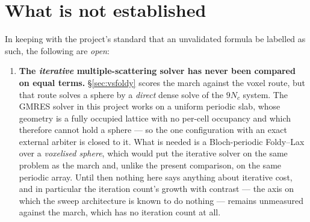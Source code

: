 \documentclass[11pt,a4paper]{article}
\begin{document}
\section{What is not established}\label{sec:open}

In keeping with the project's standard that an unvalidated formula be labelled
as such, the following are \emph{open}:

\begin{enumerate}
\item \textbf{The \emph{iterative} multiple-scattering solver has never been
      compared on equal terms.}
      \S\ref{sec:vsfoldy} scores the march against the voxel route, but that
      route solves a sphere by a \emph{direct} dense solve of the $9N_c$
      system.  The GMRES solver in this project works on a uniform periodic
      slab, whose geometry is a fully occupied lattice with no per-cell
      occupancy and which therefore cannot hold a sphere --- so the one
      configuration with an exact external arbiter is closed to it.  What is
      needed is a Bloch-periodic Foldy--Lax over a \emph{voxelised sphere},
      which would put the iterative solver on the same problem as the march
      and, unlike the present comparison, on the same periodic array.  Until
      then nothing here says anything about iterative cost, and in particular
      the iteration count's growth with contrast --- the axis on which the
      sweep architecture is known to do nothing --- remains unmeasured against
      the march, which has no iteration count at all.


\end{enumerate}
\end{document}
